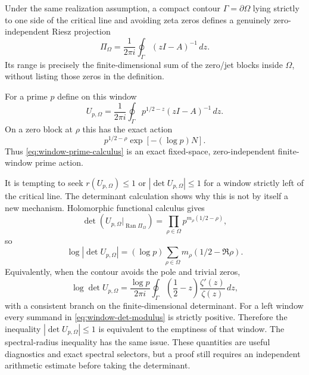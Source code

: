 \documentclass[11pt]{article}
\theoremstyle{remark}
\begin{document}
Under the same realization assumption, a compact contour $\Gamma=\partial\Omega$ lying strictly to one side of the critical line and avoiding zeta zeros defines a genuinely zero-independent Riesz projection
\begin{equation}\label{eq:riesz-window}
 \Pi_\Omega=\frac{1}{2\pi i}\oint_\Gamma (zI-A)^{-1}\,dz.
\end{equation}
Its range is precisely the finite-dimensional sum of the zero/jet blocks inside $\Omega$, without listing those zeros in the definition.

For a prime $p$ define on this window
\begin{equation}\label{eq:window-prime-calculus}
 U_{p,\Omega}
 =\frac{1}{2\pi i}\oint_\Gamma
 p^{1/2-z}(zI-A)^{-1}\,dz.
\end{equation}
On a zero block at $\rho$ this has the exact action
\[
 p^{1/2-\rho}\exp[-(\log p)N].
\]
Thus \eqref{eq:window-prime-calculus} is an exact fixed-space, zero-independent finite-window prime action.

It is tempting to seek $r(U_{p,\Omega})\le1$ or $|\det U_{p,\Omega}|\le1$ for a window strictly left of the critical line.  The determinant calculation shows why this is not by itself a new mechanism.  Holomorphic functional calculus gives
\begin{equation}\label{eq:window-det}
 \det\!\left(U_{p,\Omega}|_{\operatorname{Ran}\Pi_\Omega}\right)
 =\prod_{\rho\in\Omega}p^{m_\rho(1/2-\rho)},
\end{equation}
so
\begin{equation}\label{eq:window-det-modulus}
 \log\left|\det U_{p,\Omega}\right|
 =(\log p)\sum_{\rho\in\Omega}m_\rho(1/2-\Re\rho).
\end{equation}
Equivalently, when the contour avoids the pole and trivial zeros,
\begin{equation}\label{eq:window-det-contour}
 \log\det U_{p,\Omega}
 =\frac{\log p}{2\pi i}
 \oint_\Gamma\left(\frac12-z\right)\frac{\zeta'(z)}{\zeta(z)}\,dz,
\end{equation}
with a consistent branch on the finite-dimensional determinant.  For a left window every summand in \eqref{eq:window-det-modulus} is strictly positive.  Therefore the inequality $|\det U_{p,\Omega}|\le1$ is equivalent to the emptiness of that window.  The spectral-radius inequality has the same issue.  These quantities are useful diagnostics and exact spectral selectors, but a proof still requires an independent arithmetic estimate before taking the determinant.
\end{document}
